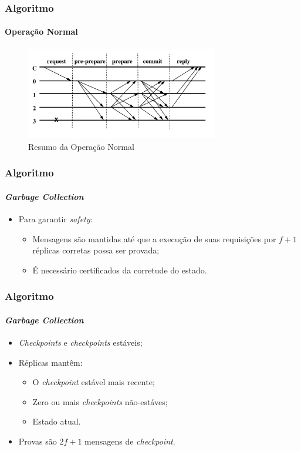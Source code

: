 \documentclass{beamer}
\begin{document}
\begin{frame}
  \frametitle{Algoritmo}
  \framesubtitle{Operação Normal}

  \begin{figure}
    \includegraphics[width=0.75\textwidth]{images/normal-case-op}
    \caption{Resumo da Operação Normal}
  \end{figure}
\end{frame}

\begin{frame}
  \frametitle{Algoritmo}
  \framesubtitle{\textit{Garbage Collection}}

  \begin{itemize}
    \item
      Para garantir \textit{safety}:
      \begin{itemize}
        \item
          Mensagens são mantidas até que a execução de suas requisições por $f + 1$ réplicas corretas possa ser provada;

        \item
          É necessário certificados da corretude do estado.
      \end{itemize}
  \end{itemize}
\end{frame}

\begin{frame}
  \frametitle{Algoritmo}
  \framesubtitle{\textit{Garbage Collection}}

  \begin{itemize}
    \item
      \textit{Checkpoints} e \textit{checkpoints} estáveis;

    \item
      Réplicas mantêm:
      \begin{itemize}
        \item
          O \textit{checkpoint} estável mais recente;

        \item
          Zero ou mais \textit{checkpoints} não-estáves;

        \item
          Estado atual.
      \end{itemize}

    \item
      Provas são $2f + 1$ mensagens de \textit{checkpoint}.
  \end{itemize}
\end{frame}
\end{document}
